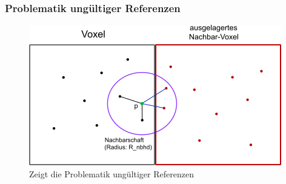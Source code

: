 \documentclass[presentation]{beamer}
\begin{document}
\begin{frame}
\frametitle{Problematik ungültiger Referenzen}


\begin{figure}
	\centering
	\includegraphics[width=0.8\linewidth]{figures/problematikDerLookupTable.png}
	\caption{Zeigt die Problematik ungültiger Referenzen}
	\label{fig:su13}
\end{figure}
\end{frame}


\end{document}
